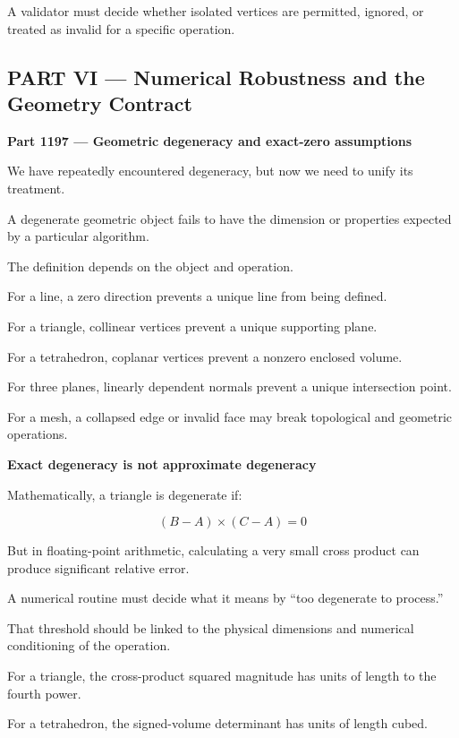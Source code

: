 A validator must decide whether isolated vertices are permitted, ignored, or treated as invalid for a specific operation.

\subsection{PART VI --- Numerical Robustness and the Geometry Contract}\label{04-visual-computing-ii-ch023-part-vi-numerical-robustness-and-the-geometry-contract}

\hypertarget{04-visual-computing-ii-ch023-part-vi-numerical-robustness-and-the-geometry-contract}{}

\textbf{Part 1197 --- Geometric degeneracy and exact-zero assumptions}

We have repeatedly encountered degeneracy, but now we need to unify its treatment.

A degenerate geometric object fails to have the dimension or properties expected by a particular algorithm.

The definition depends on the object and operation.

For a line, a zero direction prevents a unique line from being defined.

For a triangle, collinear vertices prevent a unique supporting plane.

For a tetrahedron, coplanar vertices prevent a nonzero enclosed volume.

For three planes, linearly dependent normals prevent a unique intersection point.

For a mesh, a collapsed edge or invalid face may break topological and geometric operations.

\textbf{Exact degeneracy is not approximate degeneracy}

Mathematically, a triangle is degenerate if:

\[
(B-A)\times(C-A)=0
\]

But in floating-point arithmetic, calculating a very small cross product can produce significant relative error.

A numerical routine must decide what it means by ``too degenerate to process.''

That threshold should be linked to the physical dimensions and numerical conditioning of the operation.

For a triangle, the cross-product squared magnitude has units of length to the fourth power.

For a tetrahedron, the signed-volume determinant has units of length cubed.


